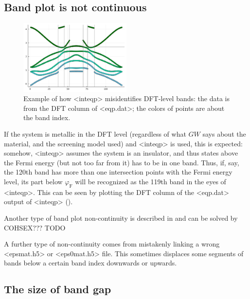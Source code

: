 \documentclass[hyperref, a4paper, 12pt]{report}
\def\texttt#1{<#1>}%
\newcommand{\shortcode}[1]{\texttt{#1}}
\begin{document}
\subsection{Band plot is not continuous}\label{sec:discontinuous-band}

\begin{figure}
    \centering
    \includegraphics[width=0.5\textwidth]{plots/dft-level-bands.pdf}
    \caption{Example of how \shortcode{inteqp} misidentifies DFT-level bands:
    the data is from the DFT column of \shortcode{eqp.dat};
    the colors of points are about the band index.}
    \label{fig:inteqp-shuffle-band-index-1}
\end{figure}

If the system is metallic in the DFT level 
(regardless of what $GW$ says about the material, 
and the screening model used)
and \shortcode{inteqp} is used, 
this is expected:
somehow, \shortcode{inteqp} assumes the system is an insulator,
and thus states above the Fermi energy (but not too far from it)
has to be in one band.
Thus, if, say, the 120th band has more than one intersection points 
with the Fermi energy level,
its part below $\varphi_{\text{F}}$ will be recognized as the 119th band
in the eyes of \shortcode{inteqp}.
This can be seen by plotting the DFT column of the \shortcode{eqp.dat} output of \shortcode{inteqp}
().

Another type of band plot non-continuity is described in \cite{berger2020potential} 
and can be solved by COHSEX??? TODO

A further type of non-continuity comes from mistakenly linking a wrong \shortcode{epsmat.h5} 
or \shortcode{eps0mat.h5} file.
This sometimes displaces some segments of bands below a certain band index downwards or upwards.

\subsection{The size of band gap}\label{sec:band-gap-problem}
\end{document}
